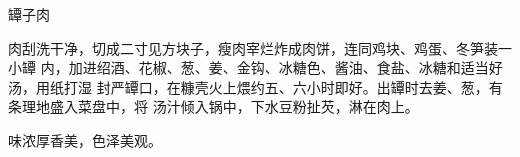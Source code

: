 %
%
%
%
%
%
%
\begin{recipe}{罈子肉}

\ingredients


\preparation

肉刮洗干净，切成二寸见方块子，瘦肉宰烂炸成肉饼，连同鸡块、鸡蛋、冬笋装一小罈
内，加进绍酒、花椒、葱、姜、金钩、冰糖色、酱油、食盐、冰糖和适当好汤，用纸打湿
封严罈口，在糠壳火上煨约五、六小时即好。出罈时去姜、葱，有条理地盛入菜盘中，将
汤汁倾入锅中，下水豆粉扯芡，淋在肉上。

\features

味浓厚香美，色泽美观。

\end{recipe}


